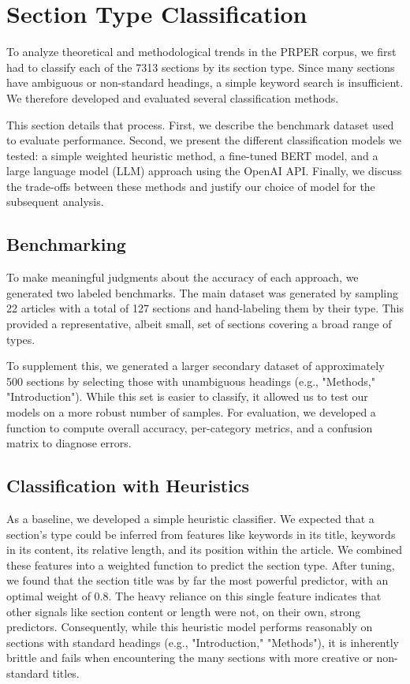 \section{Section Type Classification}

To analyze theoretical and methodological trends in the PRPER corpus, we first
had to classify each of the 7313 sections by its section type. Since many
sections have ambiguous or non-standard headings, a simple keyword search is
insufficient. We therefore developed and evaluated several classification
methods.

This section details that process. First, we describe the benchmark dataset used
to evaluate performance. Second, we present the different classification models
we tested: a simple weighted heuristic method, a fine-tuned BERT model, and a
large language model (LLM) approach using the OpenAI API. Finally, we discuss
the trade-offs between these methods and justify our choice of model for the
subsequent analysis.

\subsection{Benchmarking}

To make meaningful judgments about the accuracy of each approach, we generated
two labeled benchmarks. The main dataset was generated by sampling 22 articles
with a total of 127 sections and hand-labeling them by their type. This provided
a representative, albeit small, set of sections covering a broad range of types.

To supplement this, we generated a larger secondary dataset of approximately 500
sections by selecting those with unambiguous headings (e.g., "Methods,"
"Introduction"). While this set is easier to classify, it allowed us to test our
models on a more robust number of samples. For evaluation, we developed a
function to compute overall accuracy, per-category metrics, and a confusion
matrix to diagnose errors.


\subsection{Classification with Heuristics}

As a baseline, we developed a simple heuristic classifier. We expected that a
section's type could be inferred from features like keywords in its title,
keywords in its content, its relative length, and its position within the
article. We combined these features into a weighted function to predict the
section type. After tuning, we found that the section title was by far the most
powerful predictor, with an optimal weight of 0.8. The heavy reliance on this
single feature indicates that other signals like section content or length were
not, on their own, strong predictors. Consequently, while this heuristic model
performs reasonably on sections with standard headings (e.g., "Introduction,"
"Methods"), it is inherently brittle and fails when encountering the many
sections with more creative or non-standard titles.


